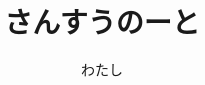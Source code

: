 \documentclass[dvipdfmx]{jsarticle}
\begin{document}
  \title{さんすうのーと}
  \author{わたし}
  \maketitle
  \clearpage

  \tableofcontents

  
  
  
  
  
  
  
  
  
  
  
  
  
  
  
  
  
  
\end{document}
